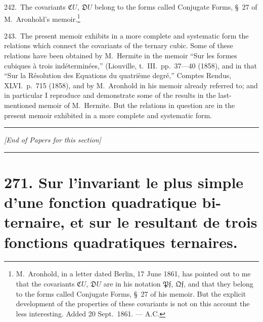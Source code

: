 \documentclass[11pt,a4paper]{book}
\begin{document}
\newpage
\setcounter{page}{336}

242.\ The covariants $\mathfrak{C}U$, $\mathfrak{D}U$ belong to the forms called Conjugate Forms, \S~27 of M.~Aronhold's memoir.\footnote{M.~Aronhold, in a letter dated Berlin, 17 June 1861, has pointed out to me that the covariants $\mathfrak{C}U$, $\mathfrak{D}U$ are in his notation $\mathfrak{P}\mathfrak{f}$, $\mathfrak{Q}\mathfrak{f}$, and that they belong to the forms called Conjugate Forms, \S~27 of his memoir. But the explicit development of the properties of these covariants is not on this account the less interesting. Added 20 Sept.~1861. --- A.C.}

243.\ The present memoir exhibits in a more complete and systematic form the relations which connect the covariants of the ternary cubic. Some of these relations have been obtained by M.~Hermite in the memoir ``Sur les formes cubiques \`a trois ind\'etermin\'ees,'' (Liouville, t.~III.\ pp.~37---40 (1858), and in that ``Sur la R\'esolution des Equations du quatri\`eme degr\'e,'' Comptes Rendus, XLVI.\ p.~715 (1858), and by M.~Aronhold in his memoir already referred to; and in particular I reproduce and demonstrate some of the results in the last-mentioned memoir of M.~Hermite. But the relations in question are in the present memoir exhibited in a more complete and systematic form.

\bigskip
\begin{center}
\rule{0.5\textwidth}{0.4pt}

\textit{[End of Papers for this section]}
\end{center}
\clearpage


\thispagestyle{empty}

\vspace{-1em}
\noindent\rule{\textwidth}{0.4pt}

\section*{271. Sur l'invariant le plus simple d'une fonction quadratique bi-ternaire,
et sur le resultant de trois fonctions quadratiques ternaires.}
\end{document}
